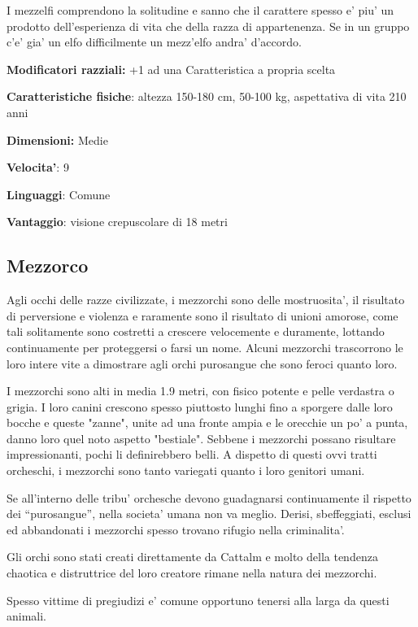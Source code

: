 \documentclass[a4paper,11pt,twoside,openany]{dndbook}
\begin{document}
I mezzelfi comprendono la solitudine e sanno che il carattere spesso e' piu' un prodotto dell'esperienza di vita che della razza di appartenenza. Se in un gruppo c'e' gia' un elfo difficilmente un mezz'elfo andra' d'accordo.

\textbf{Modificatori razziali:} +1 ad una Caratteristica a propria
scelta

\textbf{Caratteristiche fisiche}: altezza 150-180 cm, 50-100 kg, aspettativa
di vita 210 anni

\textbf{Dimensioni:} Medie

\textbf{Velocita'}: 9

\textbf{Linguaggi}: Comune

\textbf{Vantaggio}: visione crepuscolare di 18 metri


\subsection{Mezzorco}

\label{mezzorco}

Agli occhi delle razze civilizzate, i mezzorchi sono delle mostruosita', il risultato di perversione e violenza e raramente sono il risultato di unioni amorose, come tali solitamente sono costretti a crescere velocemente e duramente, lottando continuamente per proteggersi o farsi un nome. Alcuni mezzorchi trascorrono le loro intere vite a dimostrare agli orchi purosangue che sono feroci quanto loro.

I mezzorchi sono alti in media 1.9 metri, con fisico potente e pelle verdastra o grigia. I loro canini crescono spesso piuttosto lunghi fino a sporgere dalle loro bocche e queste "zanne", unite ad una fronte ampia e le orecchie un po' a punta, danno loro quel noto aspetto "bestiale". Sebbene i mezzorchi possano risultare impressionanti, pochi li definirebbero belli. A dispetto di questi ovvi tratti orcheschi, i mezzorchi sono tanto variegati quanto i loro genitori umani.

Se all'interno delle tribu' orchesche devono guadagnarsi continuamente il rispetto dei ``purosangue'', nella societa' umana non va meglio. Derisi, sbeffeggiati, esclusi ed abbandonati i mezzorchi spesso trovano rifugio nella criminalita'.

Gli orchi sono stati creati direttamente da Cattalm e molto della tendenza chaotica e distruttrice del loro creatore rimane nella natura dei mezzorchi.

Spesso vittime di pregiudizi e' comune opportuno tenersi alla larga da questi animali.
\end{document}
